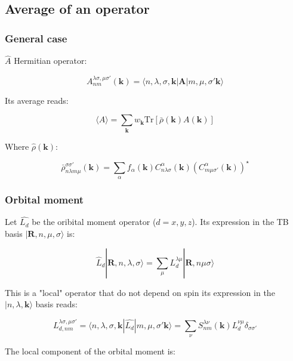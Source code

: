 \documentclass{article}
\newcommand{\bra}[1]{\langle #1|}
\newcommand{\ket}[1]{|#1\rangle}
\newcommand{\op}[1]{\hat{#1}}
\begin{document}
\noindent



\subsection{Average of an operator}

\subsubsection{General case}

\noindent
$\op{A}$ Hermitian operator:

\[\displaystyle A_{nm}^{\lambda \sigma,\mu \sigma'}(\mathbf{k})=
\langle n,\lambda,\sigma,\mathbf{k}|{\bm A}| m,\mu,
\sigma'\mathbf{k}\rangle \]


\noindent
Its average reads:

\[ \langle A \rangle =\sum_{\mathbf{k}} w_{\mathbf{k}} \text{Tr} \left[\bar{\rho}(\mathbf{k}) A(\mathbf{k}) \right] \]

\noindent
Where $\hat{\rho}(\mathbf{k})$:

\[ \bar{\rho}_{n \lambda m \mu}^{\sigma\sigma'}(\mathbf{k})=  \sum_{\alpha}  f_{\alpha}(\mathbf{k})
C_{n \lambda \sigma}^{\alpha}(\mathbf{k})(C_{m \mu \sigma'}^{\alpha}(\mathbf{k}))^{\star}    \]

\subsubsection{Orbital moment}

\noindent
Let $\op{L_{d}}$ be the oribital moment operator ($d=x,y,z$). Its expression in the TB basis $\ket{\mathbf{R},n,\mu,\sigma}$ is:

\[ \op{L}_{d} \ket{\mathbf{R},n,\lambda,\sigma} = \sum_{\mu} L_{d}^{\lambda\mu}\ket{\mathbf{R},n \mu \sigma} \]


\noindent
This is a "local" operator that do not depend on spin
its expression in the $\ket{n,\lambda,\mathbf{k}}$ basis reads:

\[ L_{d ,n m}^{\lambda \sigma, \mu \sigma'}= 
\bra{ n,\lambda,\sigma,\mathbf{k}}\op{L_{d}}\ket{ m,\mu, \sigma'\mathbf{k}}=
\sum_{\nu} S_{nm}^{\lambda\nu}(\mathbf{k})L_{d}^{\nu\mu} \delta_{\sigma \sigma'}
 \]

 \noindent
The local component of the orbital moment is:
\end{document}
